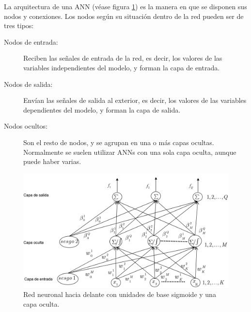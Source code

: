 La  arquitectura  de  una  ANN (véase figura \ref{redSigmoideHaciaDelante}) es  la manera
en que se disponen sus nodos y conexiones. Los nodos según  su situación  dentro  de  la
red pueden
ser  de  tres  tipos:
\begin{description}
	\item[Nodos  de entrada:] Reciben  las  señales  de entrada de la red, es decir, los
	valores de las variables independientes del modelo, y forman la capa	de entrada.
	\item[Nodos de salida:] Envían las señales de salida al exterior, es decir, los
	valores de las variables dependientes del modelo, y forman la capa de salida.
	\item[Nodos ocultos:] Son el resto de nodos,  y  se  agrupan  en  una  o  más  capas
	ocultas. Normalmente se suelen utilizar ANNs con una sola capa oculta, aunque puede
	haber varias.
\end{description}

\begin{figure}[htb]
\centering
\includegraphics[keepaspectratio,width=12.5cm]{figuras/redSigmoideHaciaDelante.jpg}
\caption{Red neuronal hacia delante con unidades de base sigmoide y una capa oculta.}
\label{redSigmoideHaciaDelante}
\end{figure}

